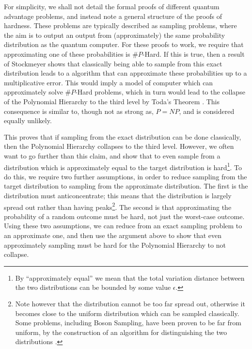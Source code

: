 For simplicity, we shall not detail the formal proofs of different quantum advantage problems, and instead note a general structure of the proofs of hardness. These problems are typically described as sampling problems, where the aim is to output an output from (approximately) the same probability distribution as the quantum computer. For these proofs to work, we require that approximating one of these probabilities is $\#P$-Hard. If this is true, then a result of Stockmeyer \cite{stockmeyer1983} shows that classically being able to sample from this exact distribution leads to a algorithm that can approximate these probabilities up to a multiplicative error. This would imply a model of computer which can approximately solve $\#P$-Hard problems, which in turn would lead to the collapse of the Polynomial Hierarchy to the third level by Toda's Theorem \cite{toda1991}. This consequence is similar to, though not as strong as, $P=NP$, and is considered equally unlikely.

This proves that if sampling from the exact distribution can be done classically, then the Polynomial Hierarchy collapses to the third level. However, we often want to go further than this claim, and show that to even sample from a distribution which is approximately equal to the target distribution is hard\footnote{By ``approximately equal'' we mean that the total variation distance between the two distributions can be bounded by some value $\epsilon$.}. To do this, we require two further assumptions, in order to reduce sampling from the target distribution to sampling from the approximate distribution. The first is the distribution must anticoncentrate; this means that the distribution is largely spread out rather than having peaks\footnote{Note however that the distribution cannot be too far spread out, otherwise it becomes close to the uniform distribution which can be sampled classically. Some problems, including Boson Sampling, have been proven to be far from uniform, by the construction of an algorithm for distinguishing the two distributions \cite{aaronson2014}.}. The second is that approximating the probability of a random outcome must be hard, not just the worst-case outcome. Using these two assumptions, we can reduce from an exact sampling problem to an approximate one, and then use the argument above to show that even approximately sampling must be hard for the Polynomial Hierarchy to not collapse.

